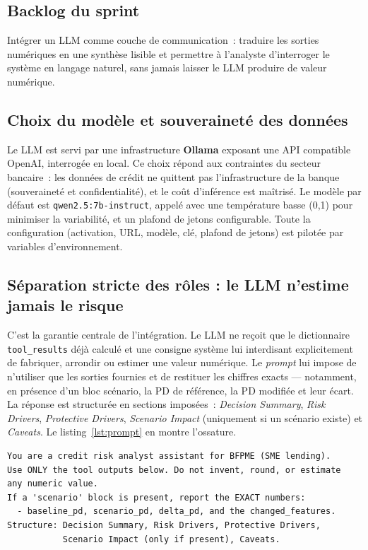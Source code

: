 \documentclass[a4paper,12pt,oneside]{report}
\newenvironment{codeblock}
  {\par\medskip\noindent\begin{minipage}{\linewidth}}
  {\end{minipage}\par\medskip}
\begin{document}
\subsection{Backlog du sprint}

Intégrer un LLM comme couche de communication~: traduire les sorties numériques en une synthèse
lisible et permettre à l'analyste d'interroger le système en langage naturel, sans jamais
laisser le LLM produire de valeur numérique.

\subsection{Choix du modèle et souveraineté des données}

Le LLM est servi par une infrastructure \textbf{Ollama} exposant une API compatible OpenAI,
interrogée en local. Ce choix répond aux contraintes du secteur bancaire~: les données de
crédit ne quittent pas l'infrastructure de la banque (souveraineté et confidentialité), et le
coût d'inférence est maîtrisé. Le modèle par défaut est \texttt{qwen2.5:7b-instruct}, appelé
avec une température basse (0{,}1) pour minimiser la variabilité, et un plafond de jetons
configurable. Toute la configuration (activation, URL, modèle, clé, plafond de jetons) est
pilotée par variables d'environnement.

\subsection{Séparation stricte des rôles : le LLM n'estime jamais le risque}

C'est la garantie centrale de l'intégration. Le LLM ne reçoit que le dictionnaire
\texttt{tool\_results} déjà calculé et une consigne système lui interdisant explicitement de
fabriquer, arrondir ou estimer une valeur numérique. Le \textit{prompt} lui impose de
n'utiliser que les sorties fournies et de restituer les chiffres exacts — notamment, en
présence d'un bloc scénario, la PD de référence, la PD modifiée et leur écart. La réponse est
structurée en sections imposées~: \textit{Decision Summary}, \textit{Risk Drivers},
\textit{Protective Drivers}, \textit{Scenario Impact} (uniquement si un scénario existe) et
\textit{Caveats}. Le listing~\ref{lst:prompt} en montre l'ossature.

\begin{codeblock}
\begin{lstlisting}[caption={Consigne imposée au LLM (extrait du prompt)}, label={lst:prompt}]
You are a credit risk analyst assistant for BFPME (SME lending).
Use ONLY the tool outputs below. Do not invent, round, or estimate
any numeric value.
If a 'scenario' block is present, report the EXACT numbers:
  - baseline_pd, scenario_pd, delta_pd, and the changed_features.
Structure: Decision Summary, Risk Drivers, Protective Drivers,
           Scenario Impact (only if present), Caveats.
\end{lstlisting}
\end{codeblock}
\end{document}
